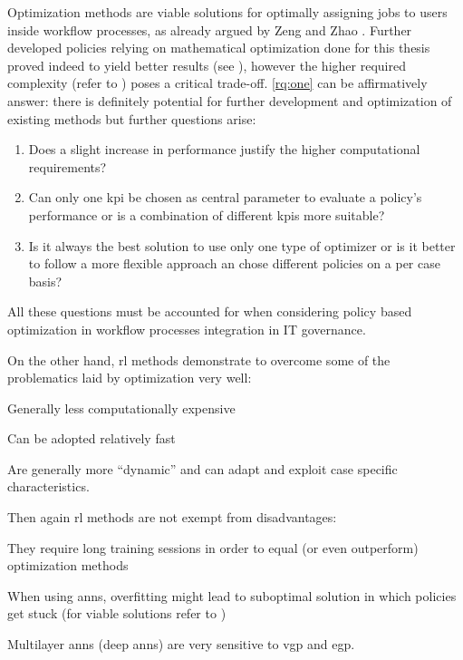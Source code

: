 \documentclass{seal_thesis}
\begin{document}
Optimization methods are viable solutions for optimally assigning jobs to users inside workflow processes, as already argued by Zeng and Zhao \cite{Zeng2005}. Further developed policies relying on mathematical optimization done for this thesis proved indeed to yield better results (see ), however the higher required complexity (refer to ) poses a critical trade-off. \ref{rq:one} can be affirmatively answer: there is definitely potential for further development and optimization of existing methods but further questions arise:

\begin{enumerate}[label=\textbf{Q. \arabic*}]
	\item Does a slight increase in performance justify the higher computational requirements?
	\item Can only one \gls{kpi} be chosen as central parameter to evaluate a policy's performance or is a combination of different \glspl{kpi} more suitable?
	\item Is it always the best solution to use only one type of optimizer or is it better to follow a more flexible approach an chose different policies on a per case basis?
\end{enumerate}

All these questions must be accounted for when considering policy based optimization in workflow processes integration in IT governance.

On the other hand, \gls{rl} methods demonstrate to overcome some of the problematics laid by optimization very well:
\begin{enumerate*}
	\item Generally less computationally expensive
	\item Can be adopted relatively fast
	\item Are generally more ``dynamic'' and can adapt and exploit case specific characteristics.
\end{enumerate*}

Then again \gls{rl} methods are not exempt from disadvantages:
\begin{enumerate*}
	\item They require long training sessions in order to equal (or even outperform) optimization methods
	\item When using \glspl{ann}, overfitting might lead to suboptimal solution in which policies get stuck (for viable solutions refer to \cite{Srivastava2014})
	\item Multilayer \glspl{ann} (\ie deep \glspl{ann}) are very sensitive to \gls{vgp} and \gls{egp}.
\end{enumerate*}
\end{document}
